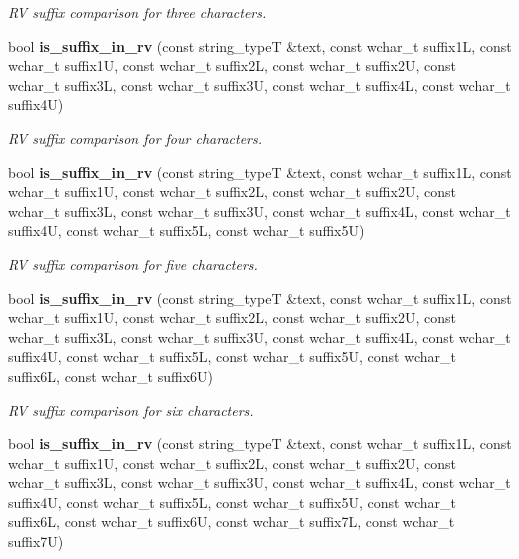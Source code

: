 \begin{DoxyCompactItemize}
\begin{DoxyCompactList}\small\item\em RV suffix comparison for three characters. \end{DoxyCompactList}\item 
bool {\bf is\+\_\+suffix\+\_\+in\+\_\+rv} (const string\+\_\+typeT \&text, const wchar\+\_\+t suffix1L, const wchar\+\_\+t suffix1U, const wchar\+\_\+t suffix2L, const wchar\+\_\+t suffix2U, const wchar\+\_\+t suffix3L, const wchar\+\_\+t suffix3U, const wchar\+\_\+t suffix4L, const wchar\+\_\+t suffix4U)\label{classstemming_1_1stem_acdaff4e73f7f3841beed04775b5d4f21}

\begin{DoxyCompactList}\small\item\em RV suffix comparison for four characters. \end{DoxyCompactList}\item 
bool {\bf is\+\_\+suffix\+\_\+in\+\_\+rv} (const string\+\_\+typeT \&text, const wchar\+\_\+t suffix1L, const wchar\+\_\+t suffix1U, const wchar\+\_\+t suffix2L, const wchar\+\_\+t suffix2U, const wchar\+\_\+t suffix3L, const wchar\+\_\+t suffix3U, const wchar\+\_\+t suffix4L, const wchar\+\_\+t suffix4U, const wchar\+\_\+t suffix5L, const wchar\+\_\+t suffix5U)\label{classstemming_1_1stem_a99ef9b0e80da18c39cc0206a666bd4b1}

\begin{DoxyCompactList}\small\item\em RV suffix comparison for five characters. \end{DoxyCompactList}\item 
bool {\bf is\+\_\+suffix\+\_\+in\+\_\+rv} (const string\+\_\+typeT \&text, const wchar\+\_\+t suffix1L, const wchar\+\_\+t suffix1U, const wchar\+\_\+t suffix2L, const wchar\+\_\+t suffix2U, const wchar\+\_\+t suffix3L, const wchar\+\_\+t suffix3U, const wchar\+\_\+t suffix4L, const wchar\+\_\+t suffix4U, const wchar\+\_\+t suffix5L, const wchar\+\_\+t suffix5U, const wchar\+\_\+t suffix6L, const wchar\+\_\+t suffix6U)\label{classstemming_1_1stem_a527b081fee02f191713a50dbc396f986}

\begin{DoxyCompactList}\small\item\em RV suffix comparison for six characters. \end{DoxyCompactList}\item 
bool {\bf is\+\_\+suffix\+\_\+in\+\_\+rv} (const string\+\_\+typeT \&text, const wchar\+\_\+t suffix1L, const wchar\+\_\+t suffix1U, const wchar\+\_\+t suffix2L, const wchar\+\_\+t suffix2U, const wchar\+\_\+t suffix3L, const wchar\+\_\+t suffix3U, const wchar\+\_\+t suffix4L, const wchar\+\_\+t suffix4U, const wchar\+\_\+t suffix5L, const wchar\+\_\+t suffix5U, const wchar\+\_\+t suffix6L, const wchar\+\_\+t suffix6U, const wchar\+\_\+t suffix7L, const wchar\+\_\+t suffix7U)\label{classstemming_1_1stem_abd6431b54fc5175c29809c627c44a587}


\end{DoxyCompactItemize}
